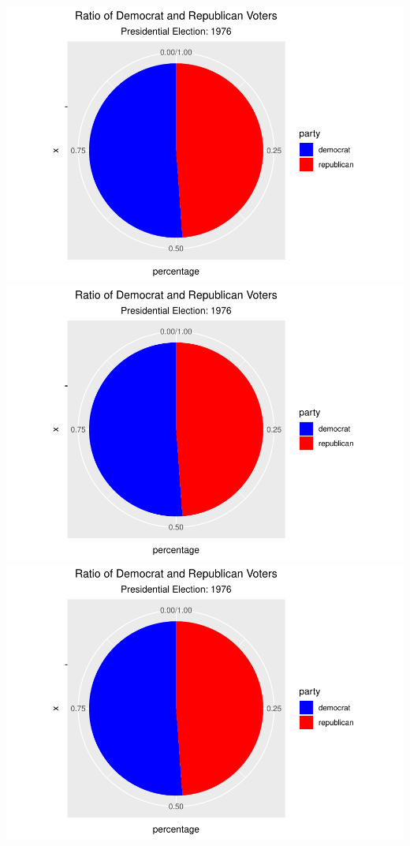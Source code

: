 \documentclass[
]{article}
\begin{document}
\includegraphics{election_files/figure-latex/anim-1.pdf}
\includegraphics{election_files/figure-latex/anim-2.pdf}
\includegraphics{election_files/figure-latex/anim-3.pdf}
\end{document}

